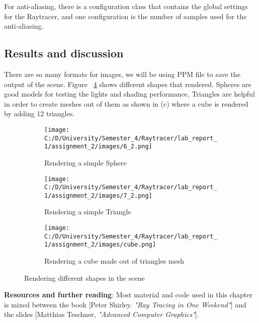 \documentclass{article}
\begin{document}
	For anti-aliasing, there is a configuration class that contains the global settings for the Raytracer, and one configuration is the number of samples used for the anti-aliasing.
	
	
	\subsection{Results and discussion}
	
	There are so many formats for images, we will be using PPM file to save the output of the scene. Figure ~\ref{fig:5} shows different shapes that rendered. Spheres are good models for testing the lights and shading performance, Triangles are helpful in order to create meshes out of them as shown in (c) where a cube is rendered by adding 12 triangles. 
	\begin{figure}[ht]
		\begin{center}
			\begin{subfigure}{.3\textwidth}
				\centering
				\texttt{[image: C:/D/University/Semester\_4/Raytracer/lab\_report\_1/assignment\_2/images/6\_2.png]}  
				\caption{Rendering a simple Sphere}
				\label{fig:sub-first}
			\end{subfigure}
			\begin{subfigure}{.3\textwidth}
				\centering
				\texttt{[image: C:/D/University/Semester\_4/Raytracer/lab\_report\_1/assignment\_2/images/7\_2.png]}  
				\caption{Rendering a simple Triangle}
				\label{fig:sub-second}
			\end{subfigure}
			\begin{subfigure}{.3\textwidth}
				\centering
				\texttt{[image: C:/D/University/Semester\_4/Raytracer/lab\_report\_1/assignment\_2/images/cube.png]}  
				\caption{Rendering a cube made out of triangles mesh}
				\label{fig:sub-third}
			\end{subfigure}
			
			\caption{Rendering different shapes in the scene}
			\label{fig:5}
			
		\end{center}
	\end{figure}
	
	\textbf{Resources and further reading}: 
	Most material and code used in this chapter is mixed between the book [Peter Shirley. 	\textit{"Ray Tracing in One Weekend"}] and the slides 		[Matthias Teschner, 	\textit{"Advanced Computer Graphics"}].
	
\end{document}
